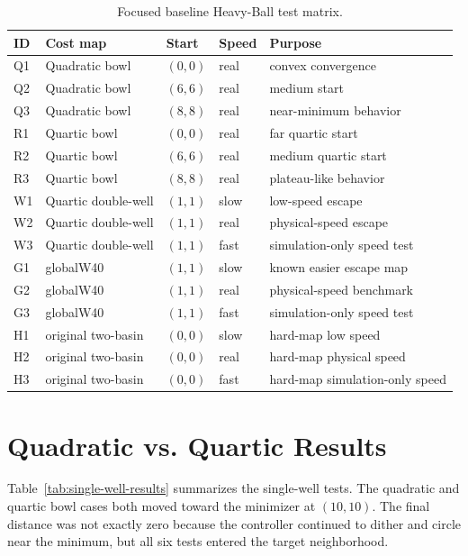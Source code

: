 \documentclass[11pt]{article}
\begin{document}
\begin{table}[H]
\centering
\begin{tabular}{lllll}
\toprule
ID & Cost map & Start & Speed & Purpose \\
\midrule
Q1 & Quadratic bowl & $(0,0)$ & real & convex convergence \\
Q2 & Quadratic bowl & $(6,6)$ & real & medium start \\
Q3 & Quadratic bowl & $(8,8)$ & real & near-minimum behavior \\
R1 & Quartic bowl & $(0,0)$ & real & far quartic start \\
R2 & Quartic bowl & $(6,6)$ & real & medium quartic start \\
R3 & Quartic bowl & $(8,8)$ & real & plateau-like behavior \\
W1 & Quartic double-well & $(1,1)$ & slow & low-speed escape \\
W2 & Quartic double-well & $(1,1)$ & real & physical-speed escape \\
W3 & Quartic double-well & $(1,1)$ & fast & simulation-only speed test \\
G1 & globalW40 & $(1,1)$ & slow & known easier escape map \\
G2 & globalW40 & $(1,1)$ & real & physical-speed benchmark \\
G3 & globalW40 & $(1,1)$ & fast & simulation-only speed test \\
H1 & original two-basin & $(0,0)$ & slow & hard-map low speed \\
H2 & original two-basin & $(0,0)$ & real & hard-map physical speed \\
H3 & original two-basin & $(0,0)$ & fast & hard-map simulation-only speed \\
\bottomrule
\end{tabular}
\caption{Focused baseline Heavy-Ball test matrix.}
\end{table}

\section{Quadratic vs. Quartic Results}

Table~\ref{tab:single-well-results} summarizes the single-well tests. The
quadratic and quartic bowl cases both moved toward the minimizer at $(10,10)$.
The final distance was not exactly zero because the controller continued to
dither and circle near the minimum, but all six tests entered the target
neighborhood.
\end{document}
